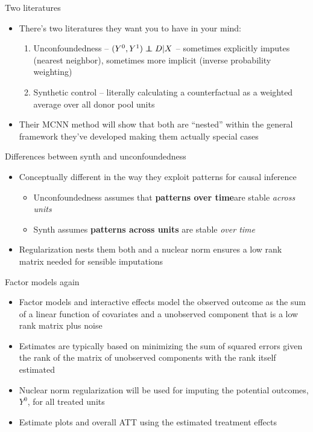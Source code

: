 \documentclass{beamer}
\newcommand\independent{\protect\mathpalette{\protect\independenT}{\perp}}
\def\independenT#1#2{\mathrel{\rlap{$#1#2$}\mkern2mu{#1#2}}}
\begin{document}
\begin{frame}{Two literatures}

\begin{itemize}
\item There's two literatures they want you to have in your mind:
	\begin{enumerate}
	\item Unconfoundedness -- $(Y^0,Y^1)\independent D|X$ -- sometimes explicitly imputes (nearest neighbor), sometimes more implicit (inverse probability weighting)
	\item Synthetic control -- literally calculating a counterfactual as a weighted average over all donor pool units
	\end{enumerate}
\item Their MCNN method will show that both are ``nested'' within the general framework they've developed making them actually special cases
\end{itemize}

\end{frame}


\begin{frame}{Differences between synth and unconfoundedness}

\begin{itemize}
\item Conceptually different in the way they exploit patterns for causal inference
	\begin{itemize}
	\item Unconfoundedness assumes that \textbf{patterns over time}are stable \emph{across units}
	\item Synth assumes \textbf{patterns across units} are stable \emph{over time}
	\end{itemize}
\item Regularization nests them both and a nuclear norm ensures a low rank matrix needed for sensible imputations

\end{itemize}

\end{frame}

\begin{frame}{Factor models again}

\begin{itemize}
\item Factor models and interactive effects model the observed outcome as the sum of a linear function of covariates and a unobserved component that is a low rank matrix plus noise
\item Estimates are typically based on minimizing the sum of squared errors given the rank of the matrix of unobserved components with the rank itself estimated
\item Nuclear norm regularization will be used for imputing the potential outcomes, $Y^0$, for all treated units
\item Estimate plots and overall ATT using the estimated treatment effects
\end{itemize}

\end{frame}
\end{document}
